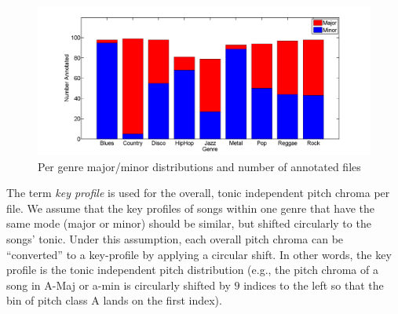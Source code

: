 \documentclass{article}
\begin{document}
\begin{figure}[tb]\label{tab:NumberOfAnnotatedDataSetEntries}
    \includegraphics[scale=.2]{graph/annotated}
	\caption{Per genre major/minor distributions and number of annotated files}
	\label{fig:confPC+MFCC}
\end{figure}


The term \textit{key profile} is used for the overall, tonic independent pitch chroma per file. We assume that the key profiles of songs within one genre that have the same mode (major or minor) should be similar, but shifted circularly to the songs' tonic. Under this assumption, each overall pitch chroma can be ``converted'' to a key-profile by applying a circular shift. In other words, the key profile is the tonic independent pitch distribution (e.g., the pitch chroma of a song in A-Maj or a-min is circularly shifted by $9$ indices to the left so that the bin of pitch class A lands on the first index).

\end{document}
